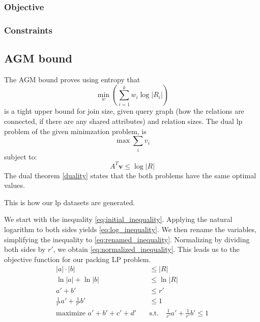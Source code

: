 \subsubsection{Objective}
\subsubsection{Constraints}

\subsection{AGM bound}
The AGM bound \parencite{atserias2013size} proves
using entropy that \[ \min_w \left( \sum_{i=1}^{k} w_i \log |R_i| \right) \]
is a tight upper bound for join size, given query graph (how the
relations are connected, if there are any shared attributes)
and relation sizes.
The dual \gls{lp} problem of the given minimzation problem, is
\[ \max \sum_{i} v_i \]
subject to:
\[ A^T \mathbf{v} \leq \log |R| \]
The dual theorem \ref{duality} states that the both problems have the same
optimal values.

This is how our \gls{lp} datasets are generated.

We start with the inequality \ref{eq:initial_inequality}. Applying the natural logarithm to both sides yields \ref{eq:log_inequality}. We then rename the variables, simplifying the inequality to \ref{eq:renamed_inequality}.
Normalizing by dividing both sides by \(r'\), we obtain \ref{eq:normalized_inequality}. This leads us to the objective function for our packing LP problem.
\begin{align}
    |a| \cdot |b|                            & \leq |R| \label{eq:initial_inequality}                                                   \\
    \ln|a| + \ln|b|                          & \leq \ln|R| \label{eq:log_inequality}                                                    \\
    a' + b'                                  & \leq r' \label{eq:renamed_inequality}                                                    \\
    \frac{1}{r'} a' + \frac{1}{r'} b'        & \leq 1 \label{eq:normalized_inequality}                                                  \\
    \text{maximize } a' + b' + c' + d' \quad & \text{s.t.} \quad \frac{1}{r'} a' + \frac{1}{r'} b' \leq 1 \label{eq:objective_function}
\end{align}

